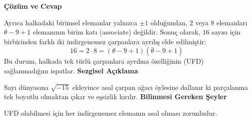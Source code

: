 \documentclass[11pt, a4paper]{article}
\newenvironment{cozum}{
    \vspace{0.5cm}
    \noindent\textcolor{green!60!black}{\faCheckCircle\enspace \textbf{\Large Çözüm ve Cevap}}\par\vspace{0.2cm}
}{}
\newenvironment{sezgisel}{
    \vspace{0.5cm}
    \noindent\textcolor{orange!80!black}{\faLightbulb\enspace \textbf{\Large Sezgisel Açıklama}}\par\vspace{0.2cm}
    \itshape
}{}
\newenvironment{bilgi}{
    \vspace{0.5cm}
    \noindent\textcolor{red!70!black}{\faExclamationTriangle\enspace \textbf{\Large Bilinmesi Gereken Şeyler}}\par\vspace{0.2cm}
}{}
\begin{document}
\begin{cozum}
Ayrıca halkadaki birimsel elemanlar yalnızca $\pm 1$ olduğundan, $2$ veya $8$ elemanları $\theta - 9 + 1$ elemanının birim katı (associate) değildir. Sonuç olarak, $16$ sayısı için birbirinden farklı iki indirgenemez çarpanlara ayrılış elde edilmiştir:
\[ 16 = 2 \cdot 8 = (\theta - 9 + 1)(\bar{\theta} - 9 + 1) \]
Bu durum, halkada tek türlü çarpanlara ayrılma özelliğinin (UFD) sağlanmadığını ispatlar.
\end{cozum}
\begin{sezgisel}
Sayı dünyasına $\sqrt{-15}$ ekleyince asal çarpan ağacı öylesine dallanır ki parçalanma tek boyutlu olmaktan çıkar ve eşsizlik kırılır.
\end{sezgisel}
\begin{bilgi}
UFD olabilmesi için her indirgenemez elemanın asal olması zorunludur.
\end{bilgi}

\newpage
\end{document}
